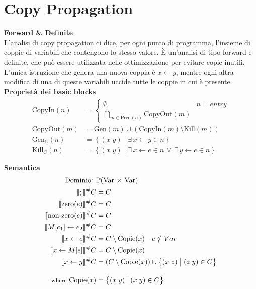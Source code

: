 \documentclass[a4paper,12pt,openany]{article}
\begin{document}
    \clearpage\section*{Copy Propagation}
    \textbf{Forward \& Definite}\\[1em]
    L'analisi di copy propagation ci dice, per ogni punto di programma, l'insieme di coppie di variabili che contengono lo stesso valore. È un'analisi di tipo forward e definite, che può essere utilizzata nelle ottimizzazione per evitare copie inutili. L'unica istruzione che genera una nuova coppia è $x\leftarrow y$, mentre ogni altra modifica di una di queste variabili uccide tutte le coppie in cui è presente.\\[1em]
    \noindent\textbf{Proprietà dei basic blocks}
    \begin{align*}
        \mbox{CopyIn}(n) &=
        \begin{cases}
        \emptyset & n = entry\\
        \bigcap\limits_{m\in \mbox{Pred}(n)} \mbox{CopyOut}(m)
        \end{cases}\\
        \mbox{CopyOut}(m) &= \mbox{Gen}(m) \cup (\mbox{CopyIn}(m) \setminus \mbox{Kill}(m))\\
        \mbox{Gen}_{C}(n) &= \left\{
        (x\; y) \;\big\vert\; \exists\, x\leftarrow y \in n
        \right\}\\
        \mbox{Kill}_{C}(n) &= \left\{
        (x\; y) \;\big\vert\; \exists\, x\leftarrow e \in n \,\lor\, \exists\, y\leftarrow e \in n
        \right\}
    \end{align*}
    
    \textbf{Semantica}
    \begin{align*}
        \mbox{Dominio: }& \mathbb{P}(\mbox{Var $\times$ Var})\\
        \llbracket ; \rrbracket^\#C &= C\\
        \llbracket \mbox{zero}(e) \rrbracket^\#C &= C\\
        \llbracket \mbox{non-zero}(e) \rrbracket^\#C &= C\\
        \llbracket M[e_1]\leftarrow e_2 \rrbracket^\#C &= C\\
        \llbracket x \leftarrow e \rrbracket^\#C &= C\setminus \mbox{Copie}(x)\quad e\notin Var\\
        \llbracket x \leftarrow M[e] \rrbracket^\#C &= C\setminus \mbox{Copie}(x)\\
        \llbracket x\leftarrow y \rrbracket^\#C &= (C\setminus \mbox{Copie}(x)) \cup
        \left\{
            (x\; z) \;\big\vert\; (z\; y) \in C
        \right\}\\[1em]
        \mbox{{\footnotesize where} Copie}(x) &=
        \left\{
        (x\; y) \;\big\vert\, (x\; y) \in C
        \right\}\\
    \end{align*}
    
\end{document}
